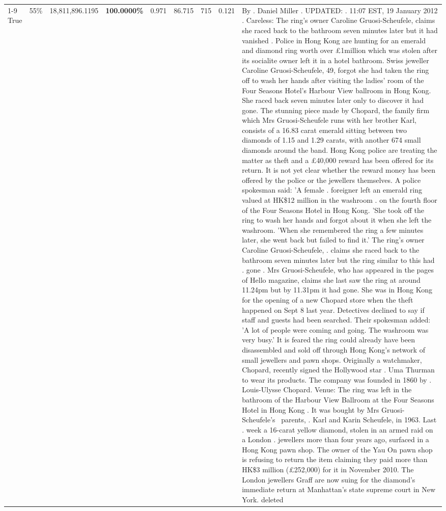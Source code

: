 \begin{table}[H]
\begin{tabular}{lllrlllll}
\cline{1-9} \cline{2-9}
True & 55\% & 18,811,896.1195 & \bfseries \color{red} 100.0000\% & 0.971 & 86.715 & 715 & 0.121 & By . Daniel Miller . UPDATED: . 11:07 EST, 19 January 2012 . Careless: The ring's owner Caroline Gruosi-Scheufele, claims she raced back to the bathroom seven minutes later but it had vanished . Police in Hong Kong are hunting for an emerald and diamond ring worth over £1million which was stolen after its socialite owner left it in a hotel bathroom. Swiss jeweller Caroline Gruosi-Scheufele, 49, forgot she had taken the ring off to wash her hands after visiting the ladies' room of the Four Seasons Hotel's Harbour View ballroom in Hong Kong. She raced back seven minutes later only to discover it had gone. The stunning piece made by Chopard, the family firm which Mrs Gruosi-Scheufele runs with her brother Karl, consists of a 16.83 carat emerald sitting between two diamonds of 1.15 and 1.29 carats, with another 674 small diamonds around the band. Hong Kong police are treating the matter as theft and a £40,000 reward has been offered for its return. It is not yet clear whether the reward money has been offered by the police or the jewellers themselves. A police spokesman said: 'A female . foreigner left an emerald ring valued at HK\$12 million in the washroom . on the fourth floor of the Four Seasons Hotel in Hong Kong. 'She took off the ring to wash her hands and forgot about it when she left the washroom. 'When she remembered the ring a few minutes later, she went back but failed to find it.' The ring's owner Caroline Gruosi-Scheufele, . claims she raced back to the bathroom seven minutes later but the ring similar to this had . gone . Mrs Gruosi-Scheufele, who has appeared in the pages of Hello magazine, claims she last saw the ring at around 11.24pm but by 11.31pm it had gone. She was in Hong Kong for the opening of a new Chopard store when the theft happened on Sept 8 last year. Detectives declined to say if staff and guests had been searched. Their spokesman added: 'A lot of people were coming and going. The washroom was very busy.' It is feared the ring could already have been disassembled and sold off through Hong Kong's network of small jewellers and pawn shops. Originally a watchmaker, Chopard, recently signed the Hollywood star . Uma Thurman to wear its products. The company was founded in 1860 by . Louis-Ulysse Chopard. Venue: The ring was left in the bathroom of the Harbour View Ballroom at the Four Seasons Hotel in Hong Kong . It was bought by Mrs Gruosi-Scheufele's  parents, . Karl and Karin Scheufele, in 1963. Last . week a 16-carat yellow diamond, stolen in an armed raid on a London . jewellers more than four years ago, surfaced in a Hong Kong pawn shop. The owner of the Yau On pawn shop is refusing to return the item claiming they paid more than HK\$3 million (£252,000) for it in November 2010. The London jewellers Graff are now suing for the diamond’s immediate return at Manhattan’s state supreme court in New York. deleted \\

\end{tabular}
\end{table}
